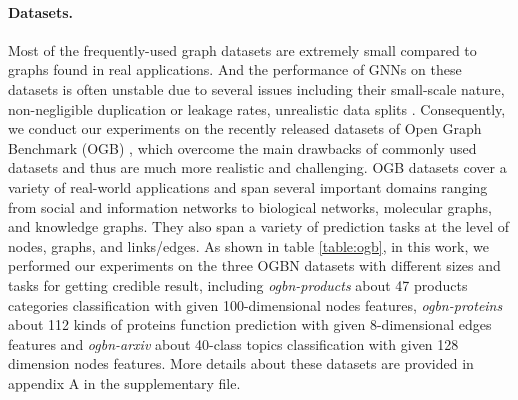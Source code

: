\paragraph{Datasets.} Most of the frequently-used graph datasets are extremely small compared to graphs found in real applications. And the performance of GNNs on these datasets is often unstable due to several issues including
their small-scale nature, non-negligible duplication or leakage rates, unrealistic data splits \cite{hu2020open}. Consequently, we conduct our experiments on the recently released datasets of Open Graph Benchmark (OGB) \cite{hu2020open}, which overcome the main drawbacks of commonly used datasets and thus
are much more realistic and challenging. OGB datasets cover a variety of real-world applications and span several important domains ranging from social and information networks to biological networks, molecular graphs, and knowledge graphs. They also span a variety of prediction tasks at the level of nodes, graphs, and links/edges. As shown in table \ref{table:ogb}, in this work, we performed our experiments on the three OGBN datasets with different sizes and tasks for getting credible result, including \emph{ogbn-products} about 47 products categories classification with given 100-dimensional nodes features, \emph{ogbn-proteins} about 112 kinds of proteins function prediction with given 8-dimensional edges features and \emph{ogbn-arxiv} about 40-class topics classification with given 128 dimension nodes features. More details about these datasets are provided in appendix A in the supplementary file.



\begin{table}[htbp]
	\setlength{\abovecaptionskip}{-0cm}
	
	\begin{center}
	\end{center}
	\caption{The hyper-paramerter setting of our model}
	\label{table:params}
	\vspace{-4mm}
\end{table}

